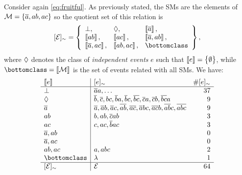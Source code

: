 \documentclass{article}
\begin{document}
Consider again \cref{eq:fruitful}.  As previously stated, the
\aclp{SM} are the elements of \({\cal M} = \set{\ensuremath{\overline{a}}, ab, ac}\)
so the quotient set of this relation is
\begin{equation*}
	\class{\EVENTSset} = \set{
		\begin{array}{lll}
			\inconsistent,           &
			\indepclass,             &
			\stablecore{\co{a}},       \\
			\stablecore{ab},         &
			\stablecore{ac},         &
			\stablecore{\co{a}, ab},   \\
			\stablecore{\co{a}, ac}, &
			\stablecore{ab, ac},     &
			\bottomclass
		\end{array}
	},
\end{equation*}
where \(\Diamond\) denotes the class of \emph{independent
	events} \(e\) such that \(\left\llbracket e \right\rrbracket = \set{\emptyset}\),
while \(\bottomclass = \stablecore{\MODELset}\) is the set of
events related with all \acp{SM}.  We have:
%
\begin{equation*}
	\begin{array}{l|lr}
		\stablecore{e}
		 & \class{e}
		 & \# \class{e}                                                                       \\
		\hline
		\inconsistent
		 & \co{a}a, \ldots
		 & 37                                                                                 \\
		\indepclass
		 & \co{b}, \co{c}, bc, \co{b}a, \co{b}c, \co{bc}, \co{c}a, \co{c}b, \co{bc}a
		 & 9                                                                                  \\
		\co{a}
		 & \co{a}, \co{a}b, \co{a}c, \co{ab}, \co{ac}, \co{a}bc, \co{ac}b, \co{ab}c, \co{abc}
		 & 9                                                                                  \\
		ab
		 & b, ab, \co{c}ab
		 & 3                                                                                  \\
		ac
		 & c, ac, \co{b}ac
		 & 3                                                                                  \\
		\co{a}, ab
		 &
		 & 0                                                                                  \\
		\co{a}, ac
		 &
		 & 0
		\\
		ab, ac
		 & a, abc
		 & 2                                                                                  \\
		\bottomclass
		 & \emptyevent
		 & 1
		\\
		\hline \class{\EVENTSset}
		 & \EVENTSset
		 & 64
	\end{array}
\end{equation*}
\end{document}
